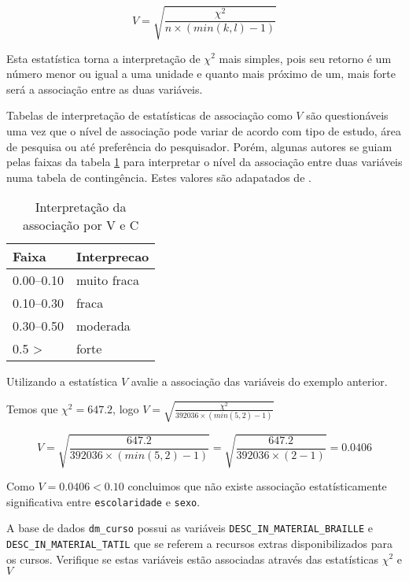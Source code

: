 \documentclass[11pt,]{style/krantz}
\theoremstyle{definition}
\theoremstyle{definition}
\theoremstyle{definition}
\theoremstyle{remark}
\let\BeginKnitrBlock\begin \let\EndKnitrBlock\end
\begin{document}
\[V = \sqrt{\frac{\chi^2}{n \times (min(k,l)-1)}}\]

Esta estatística torna a interpretação de \(\chi^2\) mais simples, pois seu retorno é um número menor ou igual a uma unidade e quanto mais próximo de um, mais forte será a associação entre as duas variáveis.

Tabelas de interpretação de estatísticas de associação como \(V\) são questionáveis uma vez que o nível de associação pode variar de acordo com tipo de estudo, área de pesquisa ou até preferência do pesquisador. Porém, algunas autores se guiam pelas faixas da tabela \ref{tab:tab12} para interpretar o nível da associação entre duas variáveis numa tabela de contingência. Estes valores são adapatados de \citep{gravetter2016statistics}.

\begin{table}[!h]

\caption{\label{tab:tab12}Interpretação da associação por V e C}
\centering
\begin{tabular}{ll}
\toprule
Faixa & Interprecao\\
\midrule
0.00--0.10 & muito fraca\\
0.10--0.30 & fraca\\
0.30--0.50 & moderada\\
0.5 > & forte\\
\bottomrule
\end{tabular}
\end{table}

\BeginKnitrBlock{example}
\protect\hypertarget{exm:unnamed-chunk-94}{}{\label{exm:unnamed-chunk-94} }Utilizando a estatística \(V\) avalie a associação das variáveis do exemplo anterior.
\EndKnitrBlock{example}

\BeginKnitrBlock{solution}
\iffalse{} {Solução. } \fi{}Temos que \(\chi^2 = 647.2\), logo \(V = \sqrt{\frac{\chi^2}{392036 \times (min(5,2)-1)}}\)
\EndKnitrBlock{solution}

\[V = \sqrt{\frac{647.2}{392036 \times (min(5,2)-1)}} = \sqrt{\frac{647.2}{392036 \times (2-1)}} = 0.0406\]

Como \(V = 0.0406 < 0.10\) concluimos que não existe associação estatísticamente significativa entre \texttt{escolaridade} e \texttt{sexo}.

\BeginKnitrBlock{exercise}
\protect\hypertarget{exr:unnamed-chunk-96}{}{\label{exr:unnamed-chunk-96} }A base de dados \texttt{dm\_curso} possui as variáveis \texttt{DESC\_IN\_MATERIAL\_BRAILLE} e \texttt{DESC\_IN\_MATERIAL\_TATIL} que se referem a recursos extras disponibilizados para os cursos. Verifique se estas variáveis estão associadas através das estatísticas \(\chi^2\) e \(V\)
\EndKnitrBlock{exercise}
\end{document}

